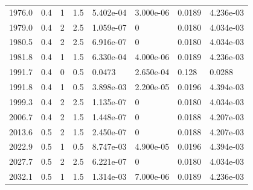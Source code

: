 \documentclass[preview]{standalone}
\begin{document}
{{{{{{\begin{tabular}{L{1.2cm}C{1.2cm} C{0.3cm}C{0.5cm} C{1.4cm}C{1.4cm} C{1.4cm}C{1.4cm}}
  1976.0  &   0.4  & 1     & 1.5 &  5.402e-04  & 3.000e-06  & 0.0189 &  4.236e-03   \\ 
  1979.0  &   0.4  & 2     & 2.5 &  1.059e-07  & 0  & 0.0180 &  4.034e-03   \\ 
  1980.5  &   0.4  & 2     & 2.5 &  6.916e-07  & 0  & 0.0180 &  4.034e-03   \\ 
  1981.8  &   0.4  & 1     & 1.5 &  6.330e-04  & 4.000e-06  & 0.0189 &  4.236e-03   \\ 
  1991.7  &   0.4  & 0     & 0.5 &  0.0473  & 2.650e-04  & 0.128 &  0.0288   \\ 
  1991.8  &   0.4  & 1     & 0.5 &  3.898e-03  & 2.200e-05  & 0.0196 &  4.394e-03   \\ 
  1999.3  &   0.4  & 2     & 2.5 &  1.135e-07  & 0  & 0.0180 &  4.034e-03   \\ 
  2006.7  &   0.4  & 2     & 1.5 &  1.448e-07  & 0  & 0.0188 &  4.207e-03   \\ 
  2013.6  &   0.5  & 2     & 1.5 &  2.450e-07  & 0  & 0.0188 &  4.207e-03   \\ 
  2022.9  &   0.5  & 1     & 0.5 &  8.747e-03  & 4.900e-05  & 0.0196 &  4.394e-03   \\ 
  2027.7  &   0.5  & 2     & 2.5 &  6.221e-07  & 0  & 0.0180 &  4.034e-03   \\ 
  2032.1  &   0.5  & 1     & 1.5 &  1.314e-03  & 7.000e-06  & 0.0189 &  4.236e-03   \\ 
\hline 
\end{tabular} 

}}}}}}
\end{document}
